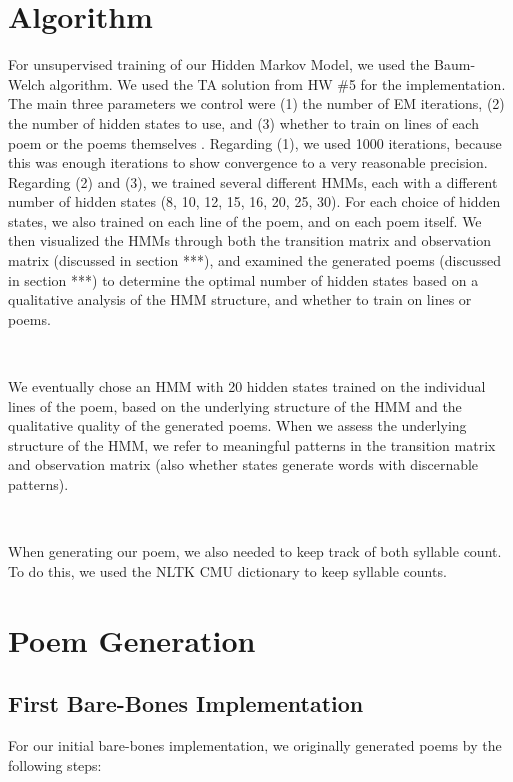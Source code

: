 \section*{Algorithm}

\medskip

For unsupervised training of our Hidden Markov Model, we used the Baum-Welch algorithm. We used the TA solution from HW \#5 for the implementation. The main three parameters we control were (1) the number of EM iterations, (2) the number of hidden states to use, and (3) whether to train on lines of each poem or the poems themselves  . Regarding (1), we used 1000 iterations, because this was enough iterations to show convergence to a very reasonable precision. Regarding (2) and (3), we trained several different HMMs, each with a different number of hidden states (8, 10, 12, 15, 16, 20, 25, 30). For each choice of hidden states, we also trained on each line of the poem, and on each poem itself. We then visualized the HMMs through both the transition matrix and observation matrix  (discussed in section ***), and examined the generated poems (discussed in section ***) to determine the optimal number of hidden states based on a qualitative analysis of the HMM structure, and whether to train on lines or poems.

~

We eventually chose an HMM with 20 hidden states trained on the individual lines of the poem, based on the underlying structure of the HMM and the qualitative quality of the generated poems. When we assess the underlying structure of the HMM, we refer to meaningful patterns in the transition matrix and observation matrix (also whether states generate words with discernable patterns).

~

When generating our poem, we also needed to keep track of both syllable count. To do this, we used the NLTK CMU dictionary to keep syllable counts.


\medskip

\section*{Poem Generation}

\subsection*{First Bare-Bones Implementation}

For our initial bare-bones implementation, we originally generated poems by the following steps:

